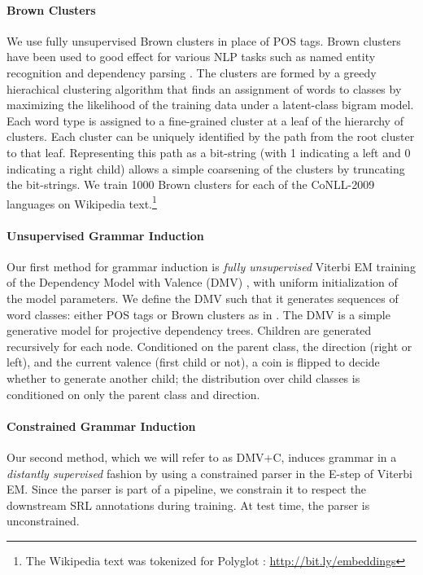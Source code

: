\documentclass[11pt]{article}
\begin{document}
\paragraph{Brown Clusters}
\label{sec:brownClusters}

We use fully unsupervised Brown clusters
\cite{brown_class-based_1992} in place of POS tags. Brown clusters have
been used to good effect for various NLP tasks such as named entity
recognition \cite{miller_name_2004} and dependency parsing
\cite{koo_simple_2008,spitkovsky_unsupervised_2011}.
The clusters are formed by a greedy hierachical clustering algorithm that finds an assignment of words to classes by
maximizing the likelihood of the training data
under a latent-class bigram model. 
Each word type is assigned to a fine-grained cluster at a leaf of the
hierarchy of clusters. Each cluster can be uniquely identified by the
path from the root cluster to that leaf. Representing this path as a
bit-string (with 1 indicating a left and 0 indicating a right child)
allows a simple coarsening of the clusters by truncating the
bit-strings. 
We train 1000 Brown clusters for each of the CoNLL-2009 languages on
Wikipedia text.\footnote{The Wikipedia text was tokenized for Polyglot
  \cite{al-rfou_polyglot:_2013}: \url{http://bit.ly/embeddings}}

\paragraph{Unsupervised Grammar Induction}
\label{sec:unsupervisedGrammarInduction}
Our first method for grammar induction is \emph{fully unsupervised} 
Viterbi EM training of the Dependency Model with Valence (DMV)
\cite{klein_corpus-based_2004}, with uniform initialization of the
model parameters. 
We define the DMV such that it generates sequences of word classes:
either POS tags or Brown clusters as in
.
 The DMV is a simple generative model for projective
dependency trees. Children are generated recursively
for each node. Conditioned on the parent class, the direction (right or
left), and the current valence (first child or not), a coin is flipped to
decide whether to generate another child; the distribution over child
classes is conditioned on only the parent class and direction.

\paragraph{Constrained Grammar Induction}
\label{sec:constrainedGrammarInduction}
Our second method, which we will refer to as DMV+C, induces grammar 
in a \emph{distantly supervised} fashion by
using a constrained parser in the E-step of Viterbi EM.
Since the parser is part of a pipeline, we constrain it to respect
the downstream SRL annotations  during training.
At test time, the parser is unconstrained.
\end{document}
